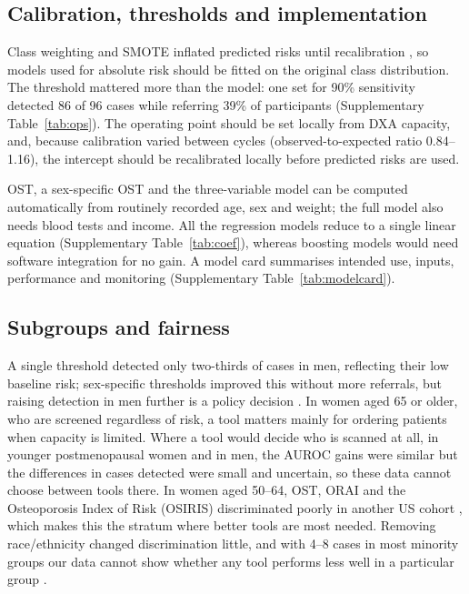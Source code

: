\documentclass[11pt,a4paper]{article}
\begin{document}
\subsection{Calibration, thresholds and implementation}
Class weighting and SMOTE inflated predicted risks until recalibration \cite{vandengoorbergh2022}, so models used for absolute risk should be fitted on the original class distribution. The threshold mattered more than the model: one set for 90\% sensitivity detected 86 of 96 cases while referring 39\% of participants (Supplementary Table~\ref{tab:ops}). The operating point should be set locally from DXA capacity, and, because calibration varied between cycles (observed-to-expected ratio 0.84--1.16), the intercept should be recalibrated locally before predicted risks are used.

OST, a sex-specific OST and the three-variable model can be computed automatically from routinely recorded age, sex and weight; the full model also needs blood tests and income. All the regression models reduce to a single linear equation (Supplementary Table~\ref{tab:coef}), whereas boosting models would need software integration for no gain. A model card summarises intended use, inputs, performance and monitoring (Supplementary Table~\ref{tab:modelcard}).

\subsection{Subgroups and fairness}
A single threshold detected only two-thirds of cases in men, reflecting their low baseline risk; sex-specific thresholds improved this without more referrals, but raising detection in men further is a policy decision \cite{uspstf2025}. In women aged 65 or older, who are screened regardless of risk, a tool matters mainly for ordering patients when capacity is limited. Where a tool would decide who is scanned at all, in younger postmenopausal women and in men, the AUROC gains were similar but the differences in cases detected were small and uncertain, so these data cannot choose between tools there. In women aged 50--64, OST, ORAI and the Osteoporosis Index of Risk (OSIRIS) discriminated poorly in another US cohort \cite{zheng2025}, which makes this the stratum where better tools are most needed. Removing race/ethnicity changed discrimination little, and with 4--8 cases in most minority groups our data cannot show whether any tool performs less well in a particular group \cite{paulus2020,vyas2020}.
\end{document}
